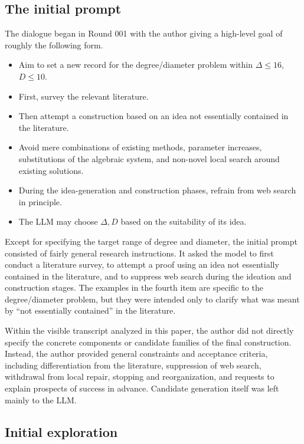 \documentclass[11pt]{article}
\theoremstyle{definition}
\theoremstyle{remark}
\providecommand{\tightlist}{\setlength{\itemsep}{0pt}\setlength{\parskip}{0pt}}
\renewcommand{\_}{\textunderscore\allowbreak}
\begin{document}
\subsection{The initial prompt}\label{the-initial-prompt}

The dialogue began in Round 001 with the author giving a high-level goal
of roughly the following form.

\begin{itemize}
\tightlist
\item
  Aim to set a new record for the degree/diameter problem within
  \(\Delta\le16\), \(D\le10\).
\item
  First, survey the relevant literature.
\item
  Then attempt a construction based on an idea not essentially contained
  in the literature.
\item
  Avoid mere combinations of existing methods, parameter increases,
  substitutions of the algebraic system, and non-novel local search
  around existing solutions.
\item
  During the idea-generation and construction phases, refrain from web
  search in principle.
\item
  The LLM may choose \(\Delta,D\) based on the suitability of its idea.
\end{itemize}

Except for specifying the target range of degree and diameter, the
initial prompt consisted of fairly general research instructions. It
asked the model to first conduct a literature survey, to attempt a proof
using an idea not essentially contained in the literature, and to
suppress web search during the ideation and construction stages. The
examples in the fourth item are specific to the degree/diameter problem,
but they were intended only to clarify what was meant by ``not
essentially contained'' in the literature.

Within the visible transcript analyzed in this paper, the author did not
directly specify the concrete components or candidate families of the
final construction. Instead, the author provided general constraints and
acceptance criteria, including differentiation from the literature,
suppression of web search, withdrawal from local repair, stopping and
reorganization, and requests to explain prospects of success in advance.
Candidate generation itself was left mainly to the LLM.

\subsection{Initial exploration}\label{initial-exploration}
\end{document}

